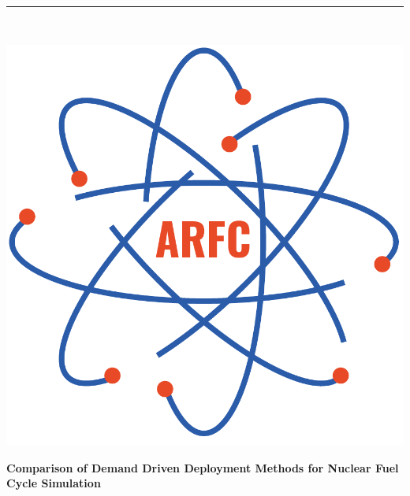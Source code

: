 \documentclass[11pt]{article}
\begin{document}

\begin{titlepage} %
    \newcommand{\HRule}{\rule{\linewidth}{0.5mm}} %

    \center %


    \HRule\\[0.2cm]

     \begin{minipage}{0.4\textwidth}
        \includegraphics[width=\textwidth]{arfc-logo}
        \end{minipage}%
        \begin{minipage}{0.6\textwidth}
        {\begin{flushright}\huge\bfseries 
                Comparison of Demand Driven Deployment Methods for Nuclear Fuel 
                Cycle Simulation\end{flushright}}


\end{minipage}
\end{titlepage}
\end{document}

